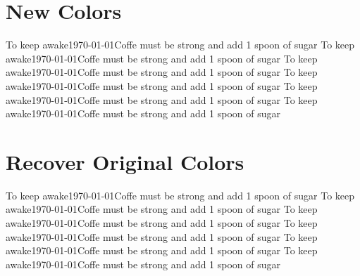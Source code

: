 \documentclass[12pt,a4paper]{article}
\begin{document}
\section{New Colors}
%
{To keep awake}{\today}{Coffe must be strong and add 1 spoon of sugar}
%
{To keep awake}{\today}{Coffe must be strong and add 1 spoon of sugar}
%
{To keep awake}{\today}{Coffe must be strong and add 1 spoon of sugar}
%
{To keep awake}{\today}{Coffe must be strong and add 1 spoon of sugar}
%
{To keep awake}{\today}{Coffe must be strong and add 1 spoon of sugar}
%
{To keep awake}{\today}{Coffe must be strong and add 1 spoon of sugar}


\section{Recover Original Colors}


%
{To keep awake}{\today}{Coffe must be strong and add 1 spoon of sugar}
%
{To keep awake}{\today}{Coffe must be strong and add 1 spoon of sugar}
%
{To keep awake}{\today}{Coffe must be strong and add 1 spoon of sugar}
%
{To keep awake}{\today}{Coffe must be strong and add 1 spoon of sugar}
%
{To keep awake}{\today}{Coffe must be strong and add 1 spoon of sugar}
%
{To keep awake}{\today}{Coffe must be strong and add 1 spoon of sugar}
\end{document}
